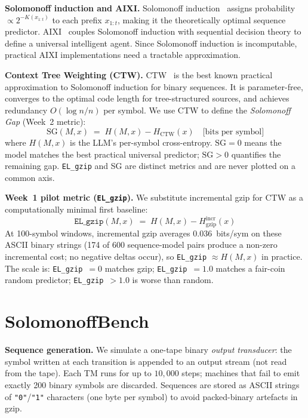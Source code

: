 \documentclass{article}
\begin{document}
\textbf{Solomonoff induction and AIXI.}
Solomonoff induction~\citep{solomonoff1964formal} assigns probability
$\propto 2^{-K(x_{1:t})}$ to each prefix $x_{1:t}$, making it the
theoretically optimal sequence predictor.
AIXI~\citep{hutter2000aixi} couples Solomonoff induction with sequential
decision theory to define a universal intelligent agent.
Since Solomonoff induction is incomputable, practical AIXI implementations
need a tractable approximation.

\textbf{Context Tree Weighting (CTW).}
CTW~\citep{willems1995ctw} is the best known practical approximation to
Solomonoff induction for binary sequences.
It is parameter-free, converges to the optimal code length for
tree-structured sources, and achieves redundancy $O(\log n / n)$ per symbol.
We use CTW to define the \emph{Solomonoff Gap} (Week~2 metric):
\begin{equation}
  \text{SG}(M, x) \;=\; H(M, x) - H_{\text{CTW}}(x)
  \quad \text{[bits per symbol]}
  \label{eq:sg}
\end{equation}
where $H(M, x)$ is the LLM's per-symbol cross-entropy.
$\text{SG} = 0$ means the model matches the best practical universal predictor;
$\text{SG} > 0$ quantifies the remaining gap.
\texttt{EL\_gzip} and SG are distinct metrics and are never plotted on a
common axis.

\textbf{Week~1 pilot metric (\texttt{EL\_gzip}).}
We substitute incremental gzip for CTW as a computationally minimal first
baseline:
\begin{equation}
  \texttt{EL\_gzip}(M, x) \;=\; H(M, x) - H_{\text{gzip}}^{\text{incr}}(x)
  \label{eq:elgzip}
\end{equation}
At 100-symbol windows, incremental gzip averages 0.036~bits/sym on
these ASCII binary strings (174 of 600 sequence-model pairs produce a
non-zero incremental cost; no negative deltas occur), so
\texttt{EL\_gzip} $\approx H(M, x)$ in practice.
The scale is: \texttt{EL\_gzip}~$= 0$ matches gzip;
\texttt{EL\_gzip}~$= 1.0$ matches a fair-coin random predictor;
\texttt{EL\_gzip}~$> 1.0$ is worse than random.

\section{SolomonoffBench}
\label{sec:bench}

\textbf{Sequence generation.}
We simulate a one-tape binary \emph{output transducer}: the symbol written at
each transition is appended to an output stream (not read from the tape).
Each TM runs for up to $10{,}000$ steps; machines that fail to emit
exactly 200 binary symbols are discarded.
Sequences are stored as ASCII strings of \texttt{"0"}/\texttt{"1"}
characters (one byte per symbol) to avoid packed-binary artefacts in gzip.
\end{document}
